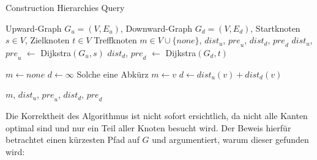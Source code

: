 \begin{algorithm}[ht]
    \caption{Construction Hierarchies Query}
    \begin{algorithmic}[1]
        \Require Upward-Graph $G_u = (V, E_u)$, Downward-Graph $G_d = (V, E_d)$, Startknoten $s \in V$, Zielknoten $t \in V$
        \Ensure Treffknoten $m \in V \cup \{ {none} \}$, ${dist}_u$, ${pre}_u$, ${dist}_d$, ${pre}_d$
        \State ${dist}_u$, ${pre}_u$ $\leftarrow$ Dijkstra$(G_u, s)$
        \State ${dist}_d$, ${pre}_d$ $\leftarrow$ Dijkstra$(G_d, t)$

        \State
        \State $m \leftarrow {none}$
        \State $d \leftarrow \infty$
        \State
        Solche eine Abkürz
        \State $m \leftarrow v$
        \State $d \leftarrow {dist}_u(v) + {dist}_d(v)$
        \EndIf
        \EndFor

        \State
        \State \Return $m$, ${dist}_u$, ${pre}_u$, ${dist}_d$, ${pre}_d$
    \end{algorithmic}
    \label{ch:query_simple}
\end{algorithm}

Die Korrektheit des Algorithmus ist nicht sofort ersichtlich, da nicht alle Kanten optimal sind und nur ein Teil aller Knoten besucht wird.
Der Beweis hierfür betrachtet einen kürzesten Pfad auf $G$ und argumentiert, warum dieser gefunden wird:

